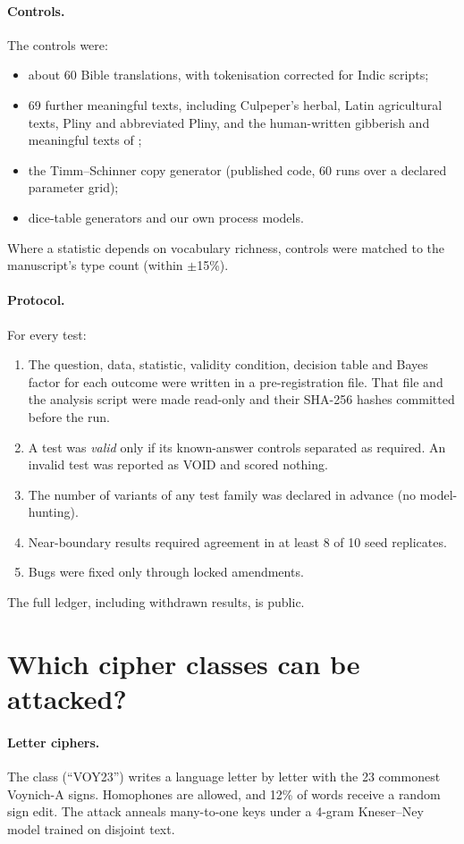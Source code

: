 \documentclass[11pt,a4paper]{article}
\begin{document}
\paragraph{Controls.} The controls were:
\begin{itemize}
\item about 60 Bible translations, with tokenisation corrected for Indic scripts;
\item 69 further meaningful texts, including Culpeper's herbal, Latin agricultural texts, Pliny and abbreviated Pliny, and the human-written gibberish and meaningful texts of \citet{gaskell2022gibberish};
\item the Timm--Schinner copy generator (published code, 60 runs over a declared parameter grid);
\item dice-table generators and our own process models.
\end{itemize}
Where a statistic depends on vocabulary richness, controls were matched to the manuscript's type count (within $\pm$15\%).

\paragraph{Protocol.} For every test:
\begin{enumerate}
\item The question, data, statistic, validity condition, decision table and Bayes factor for each outcome were written in a pre-registration file. That file and the analysis script were made read-only and their SHA-256 hashes committed before the run.
\item A test was \emph{valid} only if its known-answer controls separated as required. An invalid test was reported as VOID and scored nothing.
\item The number of variants of any test family was declared in advance (no model-hunting).
\item Near-boundary results required agreement in at least 8 of 10 seed replicates.
\item Bugs were fixed only through locked amendments.
\end{enumerate}
The full ledger, including withdrawn results, is public.

\section{Which cipher classes can be attacked?}\label{sec:cipher}
\paragraph{Letter ciphers.} The class (``VOY23'') writes a language letter by letter with the 23 commonest Voynich-A signs. Homophones are allowed, and 12\% of words receive a random sign edit. The attack anneals many-to-one keys under a 4-gram Kneser--Ney model trained on disjoint text.
\end{document}
